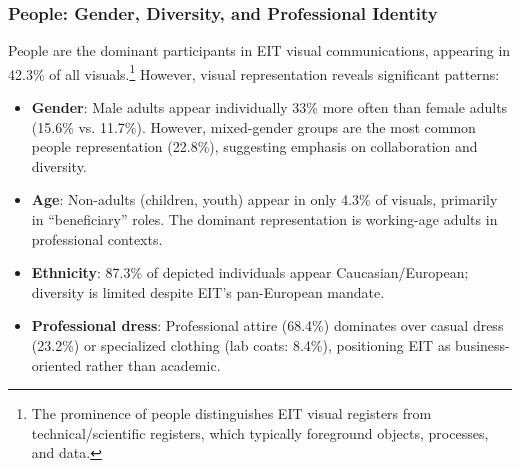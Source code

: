 \documentclass[../main.tex]{subfiles}
\begin{document}
\subsubsection{People: Gender, Diversity, and Professional Identity}

People are the dominant participants in EIT visual communications, appearing in 42.3\% of all visuals.\footnote{The prominence of people distinguishes EIT visual registers from technical/scientific registers, which typically foreground objects, processes, and data.} However, visual representation reveals significant patterns:

\begin{itemize}
    \item \textbf{Gender}: Male adults appear individually 33\% more often than female adults (15.6\% vs. 11.7\%). However, mixed-gender groups are the most common people representation (22.8\%), suggesting emphasis on collaboration and diversity.

    \item \textbf{Age}: Non-adults (children, youth) appear in only 4.3\% of visuals, primarily in ``beneficiary'' roles. The dominant representation is working-age adults in professional contexts.

    \item \textbf{Ethnicity}: 87.3\% of depicted individuals appear Caucasian/European; diversity is limited despite EIT's pan-European mandate.

    \item \textbf{Professional dress}: Professional attire (68.4\%) dominates over casual dress (23.2\%) or specialized clothing (lab coats: 8.4\%), positioning EIT as business-oriented rather than academic.
\end{itemize}

\begin{center}
\end{center}
\end{document}
